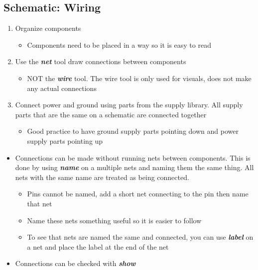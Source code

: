 \documentclass{article}
\begin{document}
\subsection{Schematic: Wiring}
\begin{enumerate}
    \item Organize components
    \begin{itemize}
        \item Components need to be placed in a way so it is easy to read
    \end{itemize}
    \item Use the \textbf{\emph{net}} tool draw connections between components
    \begin{itemize}
        \item NOT the \textbf{\emph{wire}} tool. The wire tool is only used for visuals, does not make any actual connections
    \end{itemize}
    \item Connect power and ground using parts from the supply library. All supply parts that are the same on a schematic are connected together
    \begin{itemize}
        \item Good practice to have ground supply parts pointing down and power supply parts pointing up
    \end{itemize}
\end{enumerate}
\begin{tcolorbox} [title=Tips \& Tricks]
    \begin{itemize}
        \item Connections can be made without running nets between components. This is done by using \textit{\textbf{name}} on a multiple nets and naming them the same thing. All nets with the same name are treated as being connected.
        \begin{itemize}
            \item Pins cannot be named, add a short net connecting to the pin then name that net
            \item Name these nets something useful so it is easier to follow
            \item To see that nets are named the same and connected, you can use \textit{\textbf{label}} on a net and place the label at the end of the net
        \end{itemize}
        \item Connections can be checked with \textit{\textbf{show}}
    \end{itemize}
\end{tcolorbox}
\end{document}
